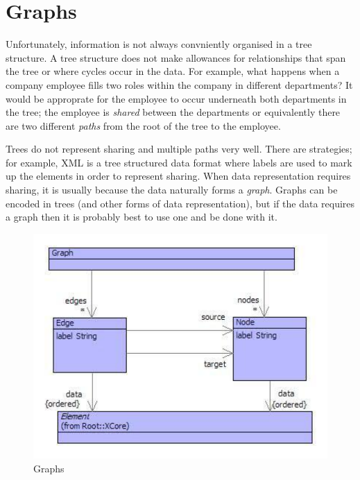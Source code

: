 \chapter{Graphs}

Unfortunately, information is not always convniently organised in
a tree structure. A tree structure does not make allowances for relationships
that span the tree or where cycles occur in the data. For example,
what happens when a company employee fills two roles within the company
in different departments? It would be approprate for the employee
to occur underneath both departments in the tree; the employee is
\textit{shared} between the departments or equivalently there are
two different \textit{paths} from the root of the tree to the employee.

Trees do not represent sharing and multiple paths very well. There
are strategies; for example, XML is a tree structured data format
where labels are used to mark up the elements in order to represent
sharing. When data representation requires sharing, it is usually
because the data naturally forms a \textit{graph}. Graphs can be encoded
in trees (and other forms of data representation), but if the data
requires a graph then it is probably best to use one and be done with
it.

%
\begin{figure}
\begin{center}

\includegraphics[width=12cm]{LanguageEngineering/Graphs/Images/Graphs}
\caption{Graphs\label{fig:Graphs}}

\end{center}
\end{figure}


